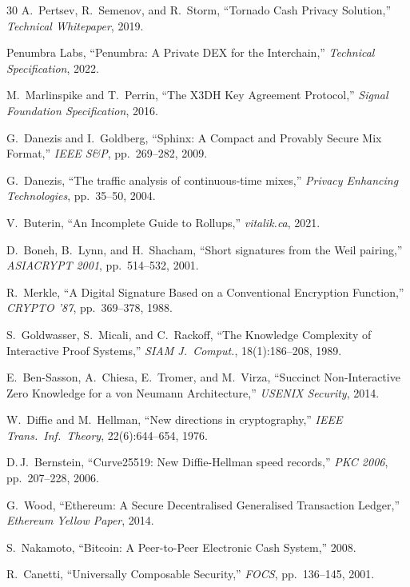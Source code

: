 \documentclass[11pt,a4paper]{article}
\begin{document}
\begin{thebibliography}{30}
A.~Pertsev, R.~Semenov, and R.~Storm,
``Tornado Cash Privacy Solution,''
\emph{Technical Whitepaper}, 2019.

Penumbra Labs,
``Penumbra: A Private DEX for the Interchain,''
\emph{Technical Specification}, 2022.

M.~Marlinspike and T.~Perrin,
``The X3DH Key Agreement Protocol,''
\emph{Signal Foundation Specification}, 2016.

G.~Danezis and I.~Goldberg,
``Sphinx: A Compact and Provably Secure Mix Format,''
\emph{IEEE S\&P}, pp.~269--282, 2009.

G.~Danezis,
``The traffic analysis of continuous-time mixes,''
\emph{Privacy Enhancing Technologies}, pp.~35--50, 2004.

V.~Buterin,
``An Incomplete Guide to Rollups,''
\emph{vitalik.ca}, 2021.

D.~Boneh, B.~Lynn, and H.~Shacham,
``Short signatures from the Weil pairing,''
\emph{ASIACRYPT 2001}, pp.~514--532, 2001.

R.~Merkle,
``A Digital Signature Based on a Conventional Encryption Function,''
\emph{CRYPTO '87}, pp.~369--378, 1988.

S.~Goldwasser, S.~Micali, and C.~Rackoff,
``The Knowledge Complexity of Interactive Proof Systems,''
\emph{SIAM J.\ Comput.}, 18(1):186--208, 1989.

E.~Ben-Sasson, A.~Chiesa, E.~Tromer, and M.~Virza,
``Succinct Non-Interactive Zero Knowledge for a von Neumann Architecture,''
\emph{USENIX Security}, 2014.

W.~Diffie and M.~Hellman,
``New directions in cryptography,''
\emph{IEEE Trans.\ Inf.\ Theory}, 22(6):644--654, 1976.

D.\,J.~Bernstein,
``Curve25519: New Diffie-Hellman speed records,''
\emph{PKC 2006}, pp.~207--228, 2006.

G.~Wood,
``Ethereum: A Secure Decentralised Generalised Transaction Ledger,''
\emph{Ethereum Yellow Paper}, 2014.

S.~Nakamoto,
``Bitcoin: A Peer-to-Peer Electronic Cash System,''
2008.

R.~Canetti,
``Universally Composable Security,''
\emph{FOCS}, pp.~136--145, 2001.

\end{thebibliography}
\end{document}
